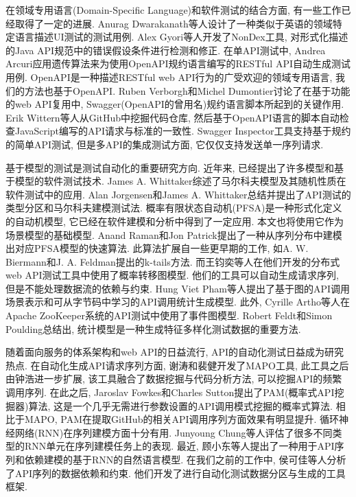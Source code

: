     	在领域专用语言(Domain-Specific Language)和软件测试的结合方面, 有一些工作已经取得了一定的进展. Anurag Dwarakanath等人\cite{dwarakanatha17}设计了一种类似于英语的领域特定语言描述UI测试的测试用例. Alex Gyori等人\cite{gyoria16}开发了NonDex工具, 对形式化描述的Java API规范中的错误假设条件进行检测和修正. 在单API测试中, Andrea Arcuri\cite{andreaa17}应用遗传算法来为使用OpenAPI规约语言编写的RESTful API自动生成测试用例. OpenAPI\cite{openapi17}是一种描述RESTful web API行为的广受欢迎的领域专用语言, 我们的方法也基于OpenAPI. Ruben Verborgh和Michel Dumontier\cite{verborgh2016web}讨论了在基于功能的web API复用中, Swagger(OpenAPI的曾用名)规约语言脚本所起到的关键作用. Erik Wittern等人\cite{wittern2017statically}从GitHub中挖掘代码仓库, 然后基于OpenAPI语言的脚本自动检查JavaScript编写的API请求与标准的一致性. Swagger Inspector\cite{swaggerinspetor17}工具支持基于规约的简单API测试, 但是多API的集成测试方面, 它仅仅支持发送单一序列请求.
    	
    	基于模型的测试是测试自动化的重要研究方向. 近年来, 已经提出了许多模型和基于模型的软件测试技术. James A. Whittaker\cite{Whittaker1997}综述了马尔科夫模型及其随机性质在软件测试中的应用. Alan Jorgensen和James A. Whittaker\cite{jorgensen2000api}总结并提出了API测试的类型分区和马尔科夫建模测试法. 概率有限状态自动机(PFSA)\cite{enriquev05}是一种形式化定义的自动机模型, 它已经在软件建模和分析中得到了一定应用. 本文也将使用它作为场景模型的基础模型. Anand Raman和Jon Patrick\cite{anand97}提出了一种从序列分布中建模出对应PFSA模型的快速算法. 此算法扩展自一些更早期的工作, 如A. W. Biermann和J. A. Feldman提出的k-tails方法\cite{abiermann72}. 而王钧奕等人\cite{junyiw17}在他们开发的分布式web API测试工具中使用了概率转移图模型. 他们的工具可以自动生成请求序列, 但是不能处理数据流的依赖与约束. Hung Viet Pham等人\cite{pham2016learning}提出了基于图的API调用场景表示和可从字节码中学习的API调用统计生成模型. 此外, Cyrille Artho等人\cite{cyrille17}在Apache ZooKeeper系统的API测试中使用了事件图模型. Robert Feldt和Simon Poulding\cite{feldt2017searching}总结出, 统计模型是一种生成特征多样化测试数据的重要方法.
    	
    	随着面向服务的体系架构和web API的日益流行, API的自动化测试日益成为研究热点. 在自动化生成API请求序列方面, 谢涛和裴健\cite{taox06}开发了MAPO工具, 此工具之后由钟浩进一步扩展\cite{Zhong2009}, 该工具融合了数据挖掘与代码分析方法, 可以挖掘API的频繁调用序列. 在此之后, Jaroslav Fowkes和Charles Sutton\cite{fowkes2016parameter}提出了PAM(概率式API挖掘器)算法, 这是一个几乎无需进行参数设置的API调用模式挖掘的概率式算法. 相比于MAPO, PAM在提取GitHub的相关API调用序列方面效果有明显提升. 循环神经网络(RNN)在序列建模方面十分有用. Junyoung Chung等人\cite{chung2014empirical}评估了很多不同类型的RNN单元在序列建模任务上的表现. 最近, 顾小东等人\cite{xiaodongg16}提出了一种用于API序列和依赖建模的基于RNN的自然语言模型. 在我们之前的工作中, 侯可佳等人\cite{kejiah13}分析了API序列的数据依赖和约束. 他们开发了进行自动化测试数据分区与生成的工具框架. 
    	
